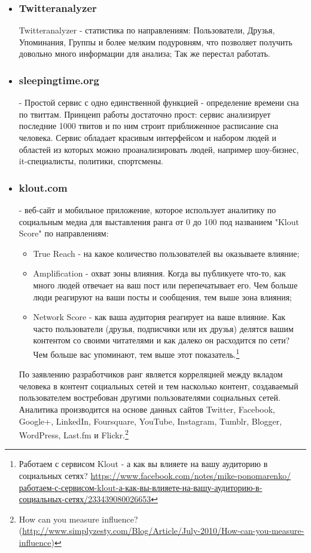 \begin{itemize}
\item \subsubsection{Twitteranalyzer}
Twitteranalyzer - статистика по  направлениям: Пользователи, Друзья, Упоминания, Группы и более мелким подуровням, что позволяет получить довольно много информации для анализа; Так же перестал работать. %
\item \subsubsection{sleepingtime.org} - Простой сервис с одно единственной функцией - определение времени сна по твиттам. Принцеип работы достаточно прост: сервис анализирует последние 1000 твитов и по ним строит приближенное расписание сна человека. Сервис обладает красивым интерфейсом и набором людей и областей из которых можно проанализировать людей, например шоу-бизнес, it-специалисты, политики, спортсмены.
\item \subsubsection{klout.com} - веб-сайт и мобильное приложение, которое использует аналитику по социальным медиа для выставления ранга от 0 до 100 под названием "Klout Score" по направлениям:
	\begin{itemize}
	\item True Reach - на какое количество пользователей вы оказываете влияние;
	\item Amplification - охват зоны влияния. Когда вы публикуете что-то, как много людей отвечает на ваш пост или перепечатывает его. Чем больше люди реагируют на ваши посты и сообщения, тем выше зона влияния;
	\item Network Score - как ваша аудитория реагирует на ваше влияние. Как часто пользователи (друзья, подписчики или их друзья) делятся вашим контентом со своими читателями и как далеко он расходится по сети? Чем больше вас упоминают, тем выше этот показатель.\footnote{Работаем с сервисом Klout - а как вы влияете на вашу аудиторию в социальных сетях? \url {https://www.facebook.com/notes/mike-ponomarenko/работаем-с-сервисом-klout-а-как-вы-влияете-на-вашу-аудиторию-в-социальных-сетях/233439080026653}}
	\end{itemize}
По заявлению разработчиков ранг является корреляцией между вкладом человека в контент социальных сетей и тем насколько контент, создаваемый пользователем востребован другими пользователями социальных сетей. Аналитика производится на основе данных сайтов Twitter, Facebook, Google+, LinkedIn, Foursquare, YouTube, Instagram, Tumblr, Blogger, WordPress, Last.fm и Flickr.\footnote{How can you measure influence? (\url{http://www.simplyzesty.com/Blog/Article/July-2010/How-can-you-measure-influence})}

\end{itemize}
